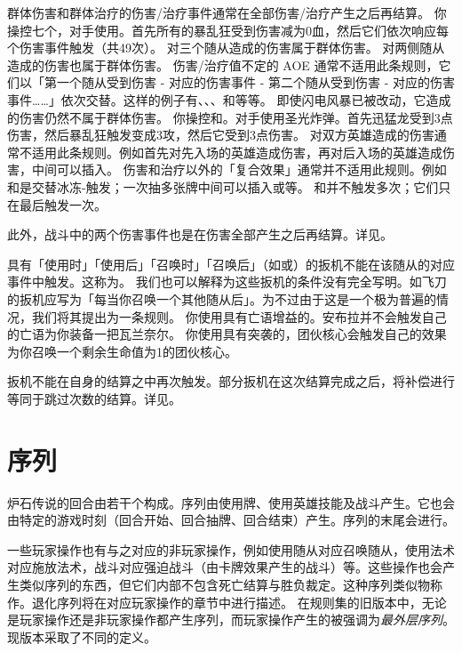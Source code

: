 群体伤害和群体治疗的伤害/治疗事件通常在全部伤害/治疗产生之后再结算。
\example 你操控七个，对手使用。首先所有的暴乱狂受到伤害减为0血，然后它们依次响应每个伤害事件触发（共49次）。
\notice {}对三个随从造成的伤害属于群体伤害。
\notice {}对两侧随从造成的伤害也属于群体伤害。
\notice 伤害/治疗值不定的 AOE 通常不适用此条规则，它们以「第一个随从受到伤害 - 对应的伤害事件 - 第二个随从受到伤害 - 对应的伤害事件……」依次交替。这样的例子有、、、和等等。
\exception 即使闪电风暴已被改动，它造成的伤害仍然不属于群体伤害。
\example 你操控和。对手使用圣光炸弹。首先迅猛龙受到3点伤害，然后暴乱狂触发变成3攻，然后它受到3点伤害。
\notice 对双方英雄造成的伤害通常不适用此条规则。例如首先对先入场的英雄造成伤害，再对后入场的英雄造成伤害，中间可以插入。
\notice 伤害和治疗以外的「复合效果」通常并不适用此规则。例如和是交替冰冻-触发；一次抽多张牌中间可以插入或等。
\notice {}和并不触发多次；它们只在最后触发一次。

此外，战斗中的两个伤害事件也是在伤害全部产生之后再结算。详见。

具有「使用时」「使用后」「召唤时」「召唤后」（如或）的扳机不能在该随从的对应事件中触发。这称为。
\notice 我们也可以解释为这些扳机的条件没有完全写明。如飞刀的扳机应写为「每当你召唤一个其他随从后」。为不过由于这是一个极为普遍的情况，我们将其提出为一条规则。
\example 你使用具有亡语增益的。安布拉并不会触发自己的亡语为你装备一把瓦兰奈尔。
\exception 你使用具有突袭的，团伙核心会触发自己的效果为你召唤一个剩余生命值为1的团伙核心。

扳机不能在自身的结算之中再次触发。部分扳机在这次结算完成之后，将补偿进行等同于跳过次数的结算。详见。

\section{序列}
\label{sequence}

炉石传说的回合由若干个构成。序列由使用牌、使用英雄技能及战斗产生。它也会由特定的游戏时刻（回合开始、回合抽牌、回合结束）产生。序列的末尾会进行。

一些玩家操作也有与之对应的非玩家操作，例如使用随从对应召唤随从，使用法术对应施放法术，战斗对应强迫战斗（由卡牌效果产生的战斗）等。这些操作也会产生类似序列的东西，但它们内部不包含死亡结算与胜负裁定。这种序列类似物称作。退化序列将在对应玩家操作的章节中进行描述。
\notice 在规则集的旧版本中，无论是玩家操作还是非玩家操作都产生序列，而玩家操作产生的被强调为\emph{最外层序列}。现版本采取了不同的定义。

